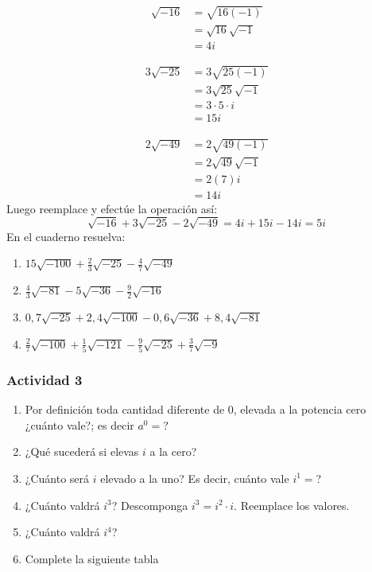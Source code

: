 \documentclass[letterpaper,11pt,twoside]{article}
\begin{document}
\begin{multicols}{2}
\begin{minipage}{0.45\textwidth}
  \begin{align*}
    \sqrt{-16}&=\sqrt{16(-1)}\\
    &=\sqrt{16}\sqrt{-1}\\
    &=4i
  \end{align*}
\end{minipage}
  \hfill
  \begin{minipage}{0.45\textwidth}
      \begin{align*}
    3\sqrt{-25}&=3\sqrt{25(-1)}\\
    &=3\sqrt{25}\sqrt{-1}\\
    &=3\cdot5\cdot i\\
    &=15i
  \end{align*}
  \end{minipage}
  \begin{align*}
    2\sqrt{-49}&=2\sqrt{49(-1)}\\
    &=2\sqrt{49}\sqrt{-1}\\
    &=2(7)i\\
    &=14i
  \end{align*}
  Luego reemplace y efectúe la operación así:
  \[ \sqrt{-16}+3\sqrt{-25}-2\sqrt{-49}=4i+15i-14i=5i \]
En el cuaderno resuelva:
    \begin{enumerate}
      \item $ 15\sqrt{-100}+\frac{2}{3}\sqrt{-25}-\frac{4}{7}\sqrt{-49} $
      \item $ \frac{4}{3}\sqrt{-81}-5\sqrt{-36}-\frac{9}{2}\sqrt{-16} $
      \item $ 0,7\sqrt{-25}+2,4\sqrt{-100}-0,6\sqrt{-36}+8,4\sqrt{-81} $
      \item $ \frac{2}{7}\sqrt{-100}+\frac{1}{5}\sqrt{-121}-\frac{9}{5}\sqrt{-25}+\frac{3}{7}\sqrt{-9} $
    \end{enumerate}
\subsubsection*{Actividad 3}
 \begin{enumerate}
  \item Por definición toda cantidad diferente de 0, elevada a la potencia cero ¿cuánto vale?; es decir $ a^0= $?
  \item ¿Qué sucederá si elevas $ i $ a la cero?
  \item ¿Cuánto será $ i $ elevado a la uno? Es decir, cuánto vale $ i^1= $?
  \item ¿Cuánto valdrá $ i^3 $? Descomponga $ i^3=i^2\cdot i $. Reemplace los valores.
  \item ¿Cuánto valdrá $ i^4 $?
  \item Complete la siguiente tabla
  

\end{enumerate}
\end{multicols}
\end{document}

